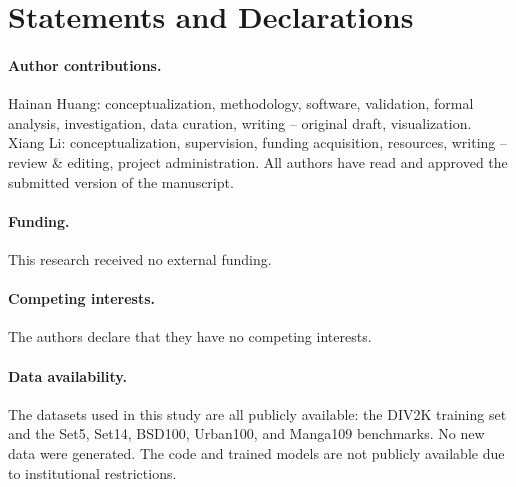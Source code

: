 \documentclass[12pt]{article}
\begin{document}

























\section*{Statements and Declarations}

\paragraph{Author contributions.}
Hainan Huang: conceptualization, methodology, software, validation, formal analysis,
investigation, data curation, writing -- original draft, visualization. Xiang Li:
conceptualization, supervision, funding acquisition, resources, writing -- review \&
editing, project administration. All authors have read and approved the submitted
version of the manuscript.

\paragraph{Funding.}
This research received no external funding.

\paragraph{Competing interests.}
The authors declare that they have no competing interests.

\paragraph{Data availability.}
The datasets used in this study are all publicly available: the DIV2K training set and the
Set5, Set14, BSD100, Urban100, and Manga109 benchmarks. No new data were generated. The code
and trained models are not publicly available due to institutional restrictions.
\end{document}
